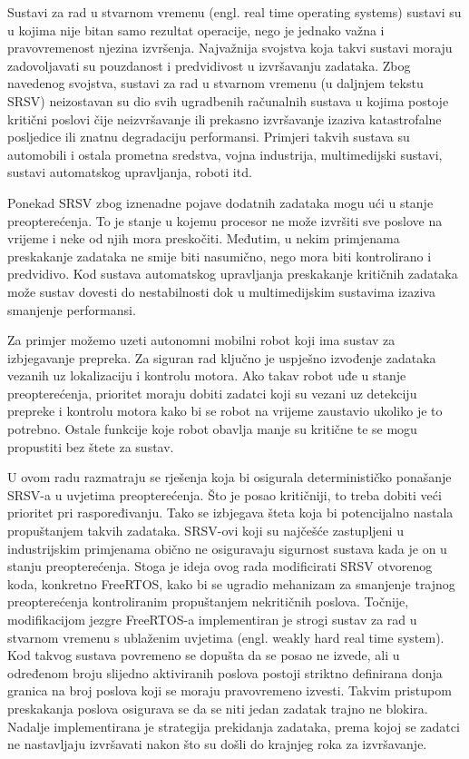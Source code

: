 \documentclass[../zavrsni.tex]{subfiles}
\begin{document}
\sloppy

\justifying



Sustavi za rad u stvarnom vremenu (engl. real time operating systems) sustavi su u kojima nije bitan samo
rezultat operacije, nego je jednako važna i pravovremenost njezina izvršenja. Najvažnija svojstva koja takvi sustavi moraju
zadovoljavati su pouzdanost i predvidivost u izvršavanju zadataka.
Zbog navedenog svojstva, sustavi za rad u stvarnom vremenu (u daljnjem tekstu SRSV) neizostavan su dio svih ugradbenih 
računalnih sustava u kojima postoje kritični poslovi čije neizvršavanje ili prekasno izvršavanje izaziva katastrofalne
posljedice ili znatnu degradaciju performansi. Primjeri takvih sustava su automobili i ostala prometna sredstva, vojna industrija, 
multimedijski sustavi, sustavi automatskog upravljanja, roboti itd. 

Ponekad SRSV zbog iznenadne pojave dodatnih zadataka mogu ući u stanje preopterećenja. To je stanje u kojemu procesor ne može 
izvršiti sve poslove na vrijeme i neke od njih mora preskočiti. Međutim, u nekim primjenama preskakanje zadataka ne smije biti nasumično, nego
mora biti kontrolirano i predvidivo. Kod sustava automatskog upravljanja preskakanje kritičnih zadataka može sustav dovesti do nestabilnosti dok u 
multimedijskim sustavima izaziva smanjenje performansi.
  
Za primjer možemo uzeti autonomni mobilni robot koji ima sustav za izbjegavanje prepreka. Za siguran rad ključno je uspješno izvođenje zadataka
vezanih uz lokalizaciju i kontrolu motora. Ako takav robot uđe u stanje preopterećenja, prioritet 
moraju dobiti zadatci koji su vezani uz detekciju prepreke i kontrolu motora kako bi se robot na vrijeme zaustavio ukoliko je to potrebno.
Ostale funkcije koje robot obavlja manje su kritične te se mogu propustiti bez štete za sustav.

U ovom radu razmatraju se rješenja koja bi osigurala determinističko ponašanje SRSV-a u uvjetima preopterećenja. Što je posao kritičniji,
to treba dobiti veći prioritet pri raspoređivanju. Tako se izbjegava šteta koja bi potencijalno nastala propuštanjem takvih zadataka. 
SRSV-ovi koji su najčešće zastupljeni u industrijskim primjenama obično ne osiguravaju sigurnost sustava kada je on u stanju preopterećenja. Stoga je ideja ovog rada 
modificirati SRSV otvorenog koda, konkretno FreeRTOS, kako bi se ugradio mehanizam za smanjenje trajnog preopterećenja kontroliranim 
propuštanjem nekritičnih poslova. Točnije,  
modifikacijom jezgre FreeRTOS-a implementiran je strogi sustav za rad u stvarnom vremenu s ublaženim uvjetima (engl. weakly hard real time system). Kod takvog sustava
povremeno se dopušta da se posao ne izvede, ali u određenom broju slijedno aktiviranih poslova postoji striktno definirana donja granica na broj 
poslova koji se moraju pravovremeno izvesti.
Takvim pristupom preskakanja poslova osigurava se da se niti jedan zadatak trajno ne blokira. Nadalje implementirana je strategija 
prekidanja zadataka, prema kojoj se zadatci ne nastavljaju izvršavati nakon što su došli do krajnjeg roka za izvršavanje.
\end{document}
